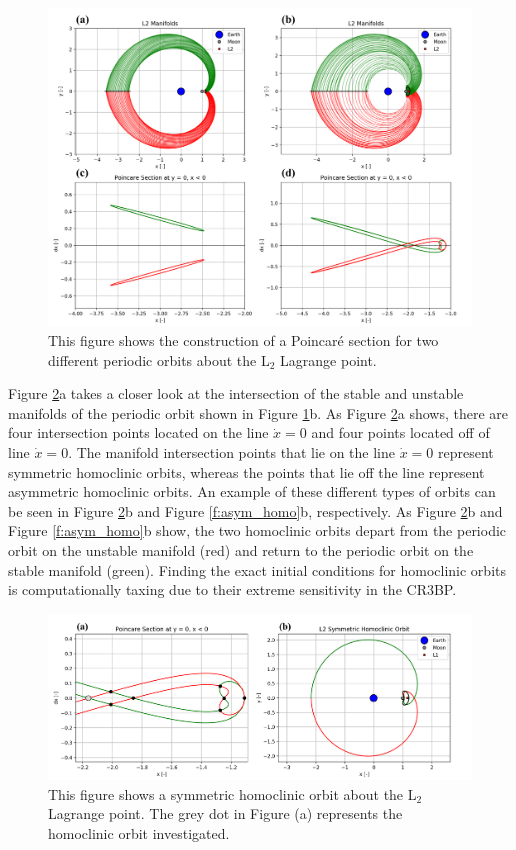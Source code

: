 \documentclass[11pt]{article} %
\begin{document}
\begin{figure}[H]
    \centering
    \includegraphics[width=\textwidth]{poincare_comb.png}
    \caption{This figure shows the construction of a Poincar\'{e} section for two different periodic orbits about the L$_2$ Lagrange point.}
    \label{f:poincare}
\end{figure}

Figure \ref{f:sym_homo}a takes a closer look at the intersection of the stable and unstable manifolds of the periodic orbit shown in Figure \ref{f:poincare}b. As Figure \ref{f:sym_homo}a shows, there are four intersection points located on the line $\dot{x}=0$ and four points located off of line $\dot{x}=0$. The manifold intersection points that lie on the line $\dot{x}=0$ represent symmetric homoclinic orbits, whereas the points that lie off the line represent asymmetric homoclinic orbits. An example of these different types of orbits can be seen in Figure \ref{f:sym_homo}b and Figure \ref{f:asym_homo}b, respectively. As Figure \ref{f:sym_homo}b and Figure \ref{f:asym_homo}b show, the two homoclinic orbits depart from the periodic orbit on the unstable manifold (red) and return to the periodic orbit on the stable manifold (green). Finding the exact initial conditions for homoclinic orbits is computationally taxing due to their extreme sensitivity in the CR3BP.

\begin{figure}[H]
    \centering
    \includegraphics[width=\textwidth]{sym_homo_comb.png}
    \caption{This figure shows a symmetric homoclinic orbit about the L$_2$ Lagrange point. The grey dot in Figure (a) represents the homoclinic orbit investigated.}
    \label{f:sym_homo}
\end{figure}
\end{document}
